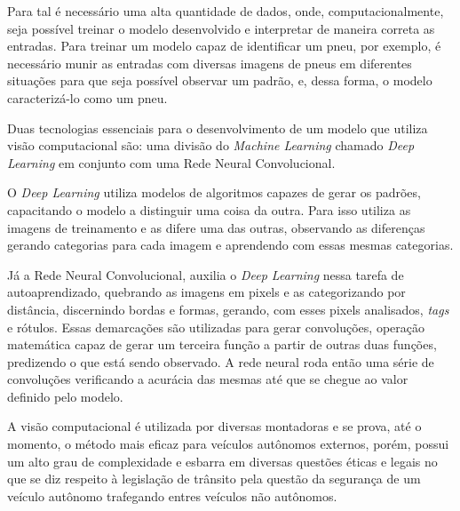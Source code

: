 Para tal é necessário uma alta quantidade de dados, onde, computacionalmente,
seja possível treinar o modelo desenvolvido e interpretar de maneira correta as
entradas. Para treinar um modelo capaz de identificar um pneu, por exemplo, é
necessário munir as entradas com diversas imagens de pneus em diferentes
situações para que seja possível observar um padrão, e, dessa forma, o modelo
caracterizá-lo como um pneu.

Duas tecnologias essenciais para o desenvolvimento de um modelo que utiliza
visão computacional são: uma divisão do \textit{Machine Learning} chamado
\textit{Deep Learning} em conjunto com uma Rede Neural Convolucional.

O \textit{Deep Learning} utiliza modelos de algoritmos capazes de gerar os
padrões, capacitando o modelo a distinguir uma coisa da outra. Para isso
utiliza as imagens de treinamento e as difere uma das outras, observando as
diferenças gerando categorias para cada imagem e aprendendo com essas mesmas
categorias.

Já a Rede Neural Convolucional, auxilia o \textit{Deep Learning} nessa tarefa
de autoaprendizado, quebrando as imagens em pixels e as categorizando por
distância, discernindo bordas e formas, gerando, com esses pixels analisados,
\textit{tags} e rótulos. Essas demarcações são utilizadas para gerar convoluções,
operação matemática capaz de gerar um terceira função a partir de outras duas
funções, predizendo o que está sendo observado. A rede neural roda então uma
série de convoluções verificando a acurácia das mesmas até que se chegue ao valor
definido pelo modelo.

A visão computacional é utilizada por diversas montadoras e se prova, até o
momento, o método mais eficaz para veículos autônomos externos, porém, possui um
alto grau de complexidade e esbarra em diversas questões éticas e legais no que
se diz respeito à legislação de trânsito pela questão da segurança de um
veículo autônomo trafegando entres veículos não autônomos.
